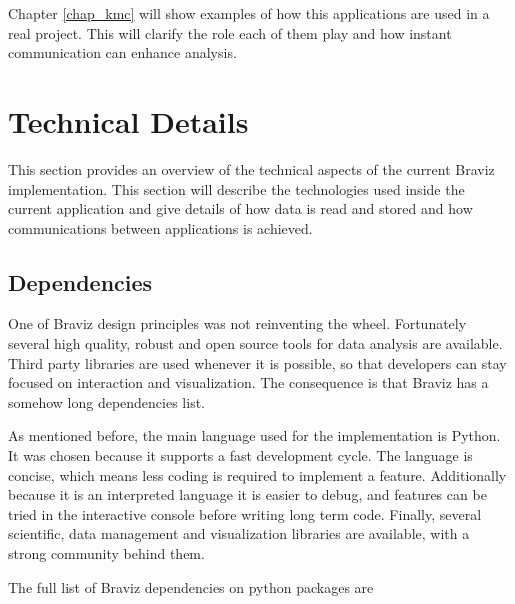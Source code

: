 Chapter \ref{chap_kmc} will show examples of how this applications are used in a real project. This will clarify the role each of them play and how instant communication can enhance analysis.



\section{Technical Details}

\label{sec_tech}



This section provides an overview of the technical aspects of the current Braviz implementation. This section will describe the technologies used inside the current application and give details of how data is read and stored and how communications between applications is achieved.


\subsection{Dependencies}

One of Braviz design principles was not reinventing the wheel. Fortunately several high quality, robust and open source tools for data analysis are available. Third party libraries are used whenever it is possible, so that developers can stay focused on interaction and visualization. The consequence is that Braviz has a somehow long dependencies list.

As mentioned before, the main language used for the implementation is Python. It was chosen because it supports a fast development cycle. The language is concise, which means less coding is required to implement a feature. Additionally because it is an interpreted language it is easier to debug, and features can be tried in the interactive console before writing long term code. Finally, several scientific, data management and visualization libraries are available, with a strong community behind them.

The full list of Braviz dependencies on python packages are

